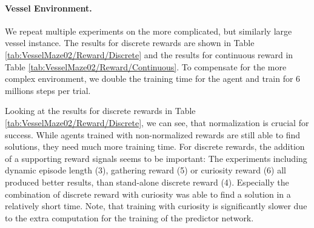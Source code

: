 \paragraph{Vessel Environment.} We repeat multiple experiments on the more complicated, but similarly large vessel instance. The results for discrete rewards are shown in Table \ref{tab:VesselMaze02/Reward/Discrete} and the results for continuous reward in Table \ref{tab:VesselMaze02/Reward/Continuous}. To compensate for the more complex environment, we double the training time for the agent and train for 6 millions steps per trial. 

Looking at the results for discrete rewards in Table \ref{tab:VesselMaze02/Reward/Discrete}, we can see, that normalization is crucial for success. While agents trained with non-normalized rewards are still able to find solutions, they need much more training time. For discrete rewards, the addition of a supporting reward signals seems to be important: The experiments including dynamic episode length (3), gathering reward (5) or curiosity reward (6) all produced better results, than stand-alone discrete reward (4). Especially the combination of discrete reward with curiosity was able to find a solution in a relatively short time. Note, that training with curiosity is significantly slower due to the extra computation for the training of the predictor network. 

